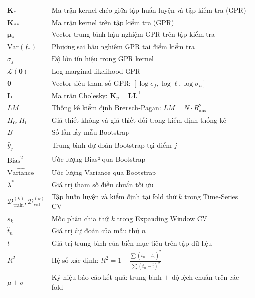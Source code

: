 \documentclass[oneside]{styles/hcmus-report}
\begin{document}
\begin{longtable}{p{} p{}}
$\mathbf{K}_*$          & Ma trận kernel chéo giữa tập huấn luyện và tập kiểm tra (GPR) \\
$\mathbf{K}_{**}$       & Ma trận kernel trên tập kiểm tra (GPR) \\
$\boldsymbol{\mu}_*$    & Vector trung bình hậu nghiệm GPR trên tập kiểm tra \\
$\mathrm{Var}(f_*)$     & Phương sai hậu nghiệm GPR tại điểm kiểm tra \\
$\sigma_f$              & Độ lớn tín hiệu trong GPR kernel \\
$\mathcal{L}(\boldsymbol{\theta})$ & Log-marginal-likelihood GPR \\
$\boldsymbol{\theta}$   & Vector siêu tham số GPR: $[\log\sigma_f, \log\ell, \log\sigma_n]$ \\
$\mathbf{L}$            & Ma trận Cholesky: $\mathbf{K}_y = \mathbf{L}\mathbf{L}^\top$ \\
$LM$                    & Thống kê kiểm định Breusch-Pagan: $LM = N \cdot R^2_{\text{aux}}$ \\
$H_0, H_1$             & Giả thiết không và giả thiết đối trong kiểm định thống kê \\
$B$                     & Số lần lấy mẫu Bootstrap \\
$\bar{\hat{y}}_j$       & Trung bình dự đoán Bootstrap tại điểm $j$ \\
$\widehat{\text{Bias}^2}$ & Ước lượng Bias² qua Bootstrap \\
$\widehat{\text{Variance}}$ & Ước lượng Variance qua Bootstrap \\
$\lambda^*$             & Giá trị tham số điều chuẩn tối ưu \\
$\mathcal{D}_{\mathrm{train}}^{(k)}, \mathcal{D}_{\mathrm{val}}^{(k)}$ 
    & Tập huấn luyện và kiểm định tại fold thứ $k$ trong Time-Series CV \\
$s_k$       & Mốc phân chia thứ $k$ trong Expanding Window CV \\
$\hat{t}_n$ & Giá trị dự đoán của mẫu thứ $n$ \\
$\bar{t}$   & Giá trị trung bình của biến mục tiêu trên tập dữ liệu \\
$R^2$       & Hệ số xác định: $R^2 = 1 - \frac{\sum(t_n-\hat{t}_n)^2}{\sum(t_n-\bar{t})^2}$ \\
$\mu \pm \sigma$ & Ký hiệu báo cáo kết quả: trung bình $\pm$ độ lệch chuẩn trên các fold \\


\end{longtable}
\end{document}
